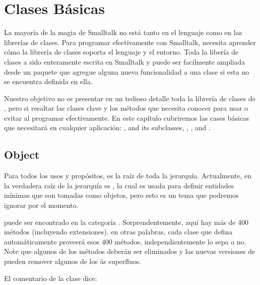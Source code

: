 \documentclass[a4paper,10pt,twoside]{book}
\begin{document}
        \sloppy
\fi
\chapter{Clases B\'asicas}

La mayor\'ia de la magia de Smalltalk no est\'a tanto en el lenguaje como en las librer\'ias de clases. Para programar efectivamente con Smalltalk, necesita aprender cómo la librer\'ia de clases soporta el lenguaje y el entorno. Toda la liber\'ia de clases a sido enteramente escrita en Smalltalk y puede ser facilmente ampliada desde un paquete que agregue alguna nueva funcionalidad a una clase si esta no se encuentra definida en ella.

Nuestro objetivo no es presentar en un tedioso detalle toda la librer\'ia de clases de \pharo, pero si resaltar las clases clave y los m\'etodos que necesita conocer para usar o evitar al programar efectivamente. En este cap\'itulo cubriremos las cases b\'asicas que necesitar\'a en cualquier aplicaci\'on: ,  and its subclasses, , ,  and .


\section{Object}
Para todos los usos y prop\'ositos,  es la ra\'iz de toda la jerarqu\'ia. Actualmente, en \pharo la verdadera ra\'iz de la jerarqu\'ia es , la cual es usada para definir entidades m\'inimas que son tomadas como objetos, pero esto es un tema que podremos ignorar por el momento.

puede ser encontrado en la categor\'ia . Sorprendentemente, aqu\'i hay m\'as de 400  m\'etodos (incluyendo extensiones). en otras palabras, cada clase que defina autom\'aticamente proveer\'a esos 400 m\'etodos, independientemente lo sepa o no. Note que algunos de los m\'etodos deber\'an ser eliminados y las nuevas versiones de \pharo pueden remover algunos de los \'as superfluos.

El comentario de la clase  dice:
\end{document}

